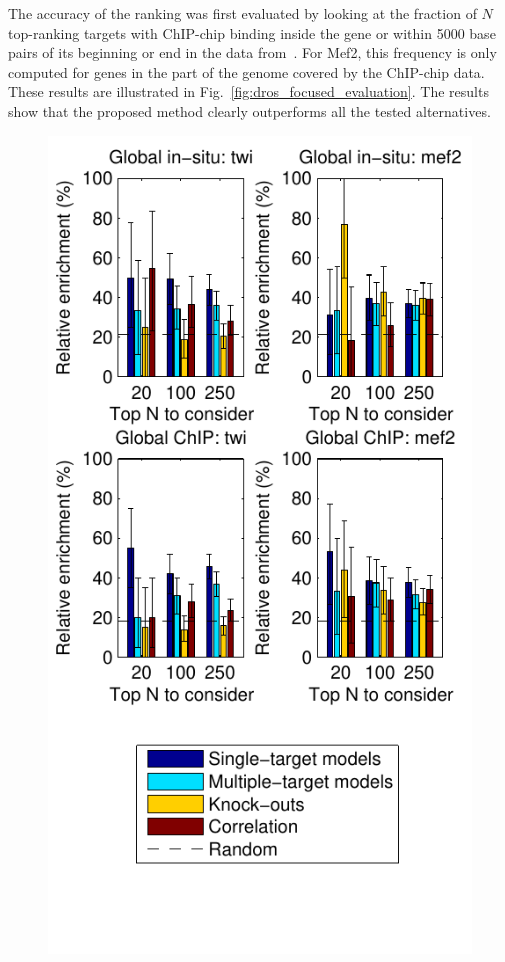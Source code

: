 \documentclass{pnastwo}
\begin{document}
\begin{article}
The accuracy of the ranking was first evaluated by looking at the
fraction of $N$ top-ranking targets with ChIP-chip binding inside the
gene or within 5000 base pairs of its beginning or end in the data
from~\cite{Sandmann2006a,Sandmann2007a}.  For Mef2, this frequency is
only computed for genes in the part of the genome covered by the
ChIP-chip data.
These results are illustrated in Fig.~\ref{fig:dros_focused_evaluation}.
The results show that the proposed method clearly outperforms all the
tested alternatives.

\begin{figure}[htb]
  \centering
  \includegraphics[trim=0mm 13mm 0mm 0mm]{dros_global_evaluation}

\end{figure}
\end{article}
\end{document}
